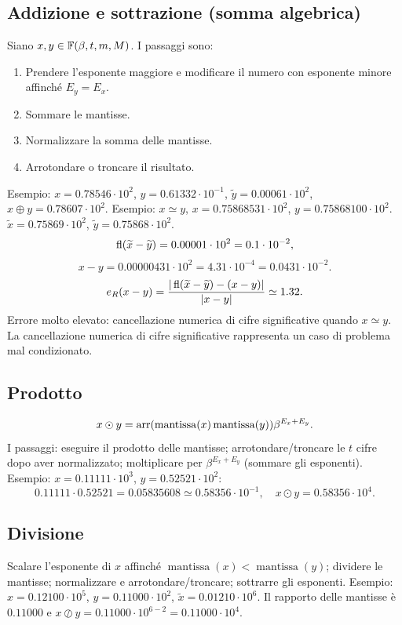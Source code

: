 \documentclass[11pt,a4paper]{article}
\newcommand{\pagina}[1]{\clearpage}
\begin{document}
\subsection*{Addizione e sottrazione (somma algebrica)}
Siano $x,y\in\mathbb F(\beta,t,m,M)$. I passaggi sono:
\begin{enumerate}\item Prendere l'esponente maggiore e modificare il numero con esponente minore affinché $E_y=E_x$.\item Sommare le mantisse.\item Normalizzare la somma delle mantisse.\item Arrotondare o troncare il risultato.\end{enumerate}
Esempio: $x=0.78546\cdot10^2$, $y=0.61332\cdot10^{-1}$, $\widetilde y=0.00061\cdot10^2$, $x\oplus y=0.78607\cdot10^2$.
Esempio: $x\simeq y$, $x=0.75868531\cdot10^2$, $y=0.75868100\cdot10^2$. $\widetilde x=0.75869\cdot10^2$, $\widetilde y=0.75868\cdot10^2$.
\[\operatorname{fl}(\widetilde x-\widetilde y)=0.00001\cdot10^2=0.1\cdot10^{-2},\]
\[x-y=0.00000431\cdot10^2=4.31\cdot10^{-4}=0.0431\cdot10^{-2}.\]
\[e_R(x-y)=\frac{|\operatorname{fl}(\widetilde x-\widetilde y)-(x-y)|}{|x-y|}\simeq1.32.\]
Errore molto elevato: cancellazione numerica di cifre significative quando $x\simeq y$.
\pagina{7}
La cancellazione numerica di cifre significative rappresenta un caso di problema mal condizionato.
\subsection*{Prodotto}
\[x\odot y=\operatorname{arr}(\operatorname{mantissa}(x)\operatorname{mantissa}(y))\beta^{E_x+E_y}.\]
I passaggi: eseguire il prodotto delle mantisse; arrotondare/troncare le $t$ cifre dopo aver normalizzato; moltiplicare per $\beta^{E_x+E_y}$ (sommare gli esponenti).
Esempio: $x=0.11111\cdot10^3$, $y=0.52521\cdot10^2$:
\[0.11111\cdot0.52521=0.05835608\simeq0.58356\cdot10^{-1},\quad x\odot y=0.58356\cdot10^4.\]
\subsection*{Divisione}
Scalare l'esponente di $x$ affinché $\operatorname{mantissa}(x)<\operatorname{mantissa}(y)$; dividere le mantisse; normalizzare e arrotondare/troncare; sottrarre gli esponenti.
Esempio: $x=0.12100\cdot10^5$, $y=0.11000\cdot10^2$, $\widetilde x=0.01210\cdot10^6$. Il rapporto delle mantisse è $0.11000$ e $x\oslash y=0.11000\cdot10^{6-2}=0.11000\cdot10^4$.
\pagina{8}
\end{document}
